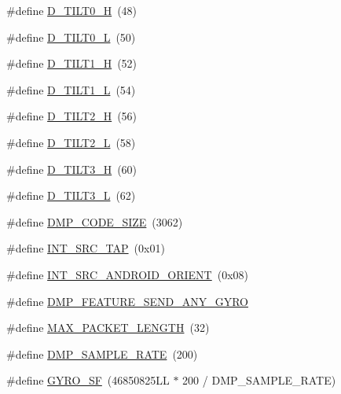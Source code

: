\begin{DoxyCompactItemize}
\#define \hyperlink{group___d_r_i_v_e_r_s_ga214de0f949e6ed8fcf11ce1b3b6eebad}{D\+\_\+\+T\+I\+L\+T0\+\_\+H}~(48)
\item 
\#define \hyperlink{group___d_r_i_v_e_r_s_ga6c85fceb5f74a918b0399d0307158ff7}{D\+\_\+\+T\+I\+L\+T0\+\_\+L}~(50)
\item 
\#define \hyperlink{group___d_r_i_v_e_r_s_ga4e1a6f62758ed17f6f950a15dae3f71f}{D\+\_\+\+T\+I\+L\+T1\+\_\+H}~(52)
\item 
\#define \hyperlink{group___d_r_i_v_e_r_s_ga4e42a147afc872019b8affbbe545e233}{D\+\_\+\+T\+I\+L\+T1\+\_\+L}~(54)
\item 
\#define \hyperlink{group___d_r_i_v_e_r_s_ga9325b74799bbe82c52821c1a3d31cb0a}{D\+\_\+\+T\+I\+L\+T2\+\_\+H}~(56)
\item 
\#define \hyperlink{group___d_r_i_v_e_r_s_ga1f94ccf82d2693832423d759dba5dbfa}{D\+\_\+\+T\+I\+L\+T2\+\_\+L}~(58)
\item 
\#define \hyperlink{group___d_r_i_v_e_r_s_ga296360133bdb8e75a844083e52ae6542}{D\+\_\+\+T\+I\+L\+T3\+\_\+H}~(60)
\item 
\#define \hyperlink{group___d_r_i_v_e_r_s_gab62313b938bb0a02efe7584203c0c950}{D\+\_\+\+T\+I\+L\+T3\+\_\+L}~(62)
\item 
\#define \hyperlink{group___d_r_i_v_e_r_s_ga304702b72a030fceea30b45d1ab53a5c}{D\+M\+P\+\_\+\+C\+O\+D\+E\+\_\+\+S\+I\+ZE}~(3062)
\item 
\#define \hyperlink{group___d_r_i_v_e_r_s_gac5690dcf21f75f38bc3ea13ad4799714}{I\+N\+T\+\_\+\+S\+R\+C\+\_\+\+T\+AP}~(0x01)
\item 
\#define \hyperlink{group___d_r_i_v_e_r_s_ga7c3f4a57d404a1321ce6dfc00e33ac4d}{I\+N\+T\+\_\+\+S\+R\+C\+\_\+\+A\+N\+D\+R\+O\+I\+D\+\_\+\+O\+R\+I\+E\+NT}~(0x08)
\item 
\#define \hyperlink{group___d_r_i_v_e_r_s_gadda8f4118bd084cfb4fcda3571585c56}{D\+M\+P\+\_\+\+F\+E\+A\+T\+U\+R\+E\+\_\+\+S\+E\+N\+D\+\_\+\+A\+N\+Y\+\_\+\+G\+Y\+RO}
\item 
\#define \hyperlink{group___d_r_i_v_e_r_s_ga973c680573b37fc359fc68d0707da355}{M\+A\+X\+\_\+\+P\+A\+C\+K\+E\+T\+\_\+\+L\+E\+N\+G\+TH}~(32)
\item 
\#define \hyperlink{group___d_r_i_v_e_r_s_ga9d0f0425cbcb58186500cb8686e41e67}{D\+M\+P\+\_\+\+S\+A\+M\+P\+L\+E\+\_\+\+R\+A\+TE}~(200)
\item 
\#define \hyperlink{group___d_r_i_v_e_r_s_gac0325c658f2911bdfc3b44fca31c684f}{G\+Y\+R\+O\+\_\+\+SF}~(46850825\+L\+L $\ast$ 200 / D\+M\+P\+\_\+\+S\+A\+M\+P\+L\+E\+\_\+\+R\+A\+T\+E)
\item 

\end{DoxyCompactItemize}
